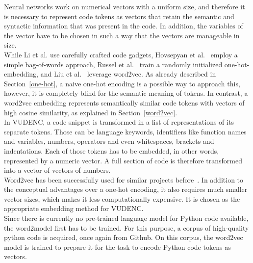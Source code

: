 \documentclass[
a4paper,
pagesize,
pdftex,
12pt,
ngerman,
fleqn,
final,
]{scrartcl}
\begin{document}
	Neural networks work on numerical vectors with a uniform size, and therefore it is necessary to represent code tokens as vectors that retain the semantic and syntactic information that was present in the code. In addition, the variables of the vector have to be chosen in such a way that the vectors are manageable in size.\\
	While Li et al.\cite{Li.2018} use carefully crafted code gadgets, Hovsepyan et al.~\cite{Hovsepyan.2012} employ a simple bag-of-words approach, Russel et al.~\cite{Russell.2018} train a randomly initialized one-hot-embedding, and Liu et al.~\cite{Liu.2018} leverage word2vec. As already described in Section~\ref{one-hot}, a naive one-hot encoding is a possible way to approach this, however, it is completely blind for the semantic meaning of tokens. In contrast, a word2vec embedding represents semantically similar code tokens with vectors of high cosine similarity, as explained in Section~\ref{word2vec}.\\
	In VUDENC, a code snippet is transformed in a list of representations of its separate tokens. Those can be language keywords, identifiers like function names and variables, numbers, operators and even whitespaces, brackets and indentations. Each of those tokens has to be embedded, in other words, represented by a numeric vector. A full section of code is therefore transformed into a vector of vectors of numbers.\\
	Word2vec has been successfully used for similar projects before~\cite{Liu.2018}. In addition to the conceptual advantages over a one-hot encoding, it also requires much smaller vector sizes, which makes it less computationally expensive. It is chosen as the appropriate embedding method for VUDENC.\\
	Since there is currently no pre-trained language model for Python code available, the word2model first has to be trained. For this purpose, a corpus of high-quality python code is acquired, once again from Github. On this corpus, the word2vec model is trained to prepare it for the task to encode Python code tokens as vectors.
	
\end{document}

